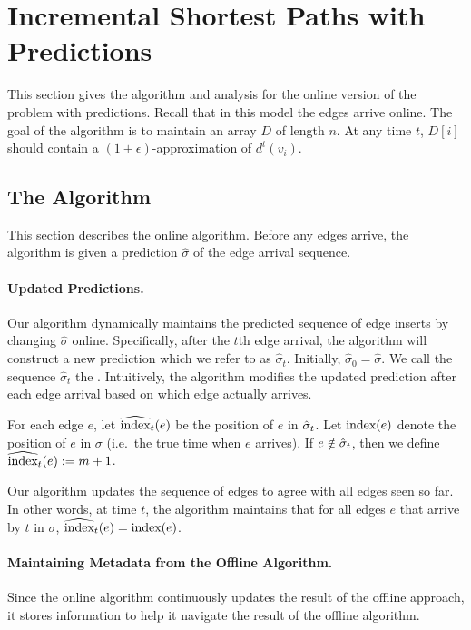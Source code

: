 \section{Incremental Shortest Paths with Predictions}

This section gives the algorithm and analysis for the online version of the problem with predictions. Recall that in this model the edges arrive online.  The goal of the algorithm is to maintain an array $D$ of length $n$.  At any time $t$, $D[i]$ should contain a $(1 + \epsilon)$-approximation of $d^t(v_i)$.

\subsection{The Algorithm}
This section describes the online algorithm. Before any edges arrive, the algorithm is given a prediction $\hat{\sigma}$ of the edge arrival sequence.  

\paragraph{Updated Predictions.}
Our algorithm dynamically maintains the predicted sequence of edge inserts by changing $\hat{\sigma}$ online.  Specifically, after the $t$th edge arrival, the algorithm will construct a new prediction which we refer to as $\hat{\sigma}_t$.  Initially,  $\hat{\sigma}_0 = \hat{\sigma}$. We call the sequence  $\hat{\sigma}_t$ the . 
Intuitively, the algorithm modifies the updated prediction after each edge arrival based on which edge actually arrives. 
 
For each edge $e$, let $\widehat{\text{index}}_t(e)$ be the position of $e$ in $\hat{\sigma}_t$.  Let $\text{index}(e)$ denote the position of $e$ in $\sigma$ (i.e.\ the true time when $e$ arrives). If $e \notin \hat{\sigma}_t$, then we define $\widehat{\text{index}}_t(e) := m+1$. 

Our algorithm updates the sequence of edges to agree with all edges seen so far.  In other words, at time $t$, the algorithm maintains that for all edges $e$ that arrive by $t$ in $\sigma$, $\widehat{\text{index}}_{t}(e) = \text{index}(e)$.

\paragraph{Maintaining Metadata from the Offline Algorithm.}
Since the online algorithm continuously updates the result of the offline approach, it stores information to help it navigate the result of the offline algorithm.

